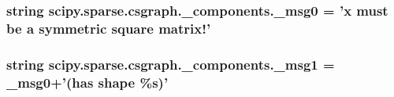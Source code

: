 \subsubsection[{\+\_\+msg0}]{\setlength{\rightskip}{0pt plus 5cm}string scipy.\+sparse.\+csgraph.\+\_\+components.\+\_\+msg0 = '{\bf x} must be {\bf a} symmetric square matrix!'}\label{namespacescipy_1_1sparse_1_1csgraph_1_1__components_a85bc8d379704c7577c9544bb51e90030}
\hypertarget{namespacescipy_1_1sparse_1_1csgraph_1_1__components_a14ac0d16483cf73d38dc6d1d549da9f6}{}
\subsubsection[{\+\_\+msg1}]{\setlength{\rightskip}{0pt plus 5cm}string scipy.\+sparse.\+csgraph.\+\_\+components.\+\_\+msg1 = {\bf \+\_\+msg0}+'(has {\bf shape} \%{\bf s})'}\label{namespacescipy_1_1sparse_1_1csgraph_1_1__components_a14ac0d16483cf73d38dc6d1d549da9f6}
